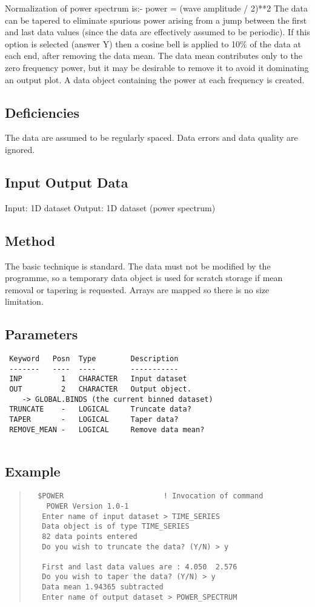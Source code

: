 \documentclass{book}
\renewcommand{\_}{{\tt\char'137}}     %
\begin{document}
Normalization of power spectrum is:-
power = (wave amplitude / 2)**2
The data can be tapered to eliminate spurious power arising from
a jump between the first and last data values (since the data
are effectively assumed to be periodic). If this option is
selected (answer Y) then a cosine bell is applied to 10\% of the
data at each end, after removing the data mean.
The data mean contributes only to the zero frequency power, but
it may be desirable to remove it to avoid it dominating an output
plot.
A data object containing the power at each frequency is created.
\subsection{Deficiencies}
The data are assumed to be regularly spaced. Data errors and data
quality are ignored.
\subsection{Input Output Data}
Input: 1D dataset
Output: 1D dataset (power spectrum)
\subsection{Method}
The basic technique is standard. The data must not be modified by
the programme, so a temporary data object is used for scratch
storage if mean removal or tapering is requested. Arrays are
mapped so there is no size limitation.
 
\subsection{Parameters}
\begin{verbatim}
 Keyword   Posn  Type        Description
 -------   ----  ----        -----------
 INP         1   CHARACTER   Input dataset
 OUT         2   CHARACTER   Output object.
    -> GLOBAL.BINDS (the current binned dataset)
 TRUNCATE    -   LOGICAL     Truncate data?
 TAPER       -   LOGICAL     Taper data?
 REMOVE_MEAN -   LOGICAL     Remove data mean?
 
\end{verbatim}\subsection{Example}
\begin{quote}\begin{verbatim}
  $POWER                       ! Invocation of command
    POWER Version 1.0-1
   Enter name of input dataset > TIME_SERIES
   Data object is of type TIME_SERIES
   82 data points entered
   Do you wish to truncate the data? (Y/N) > y
 
   First and last data values are : 4.050  2.576
   Do you wish to taper the data? (Y/N) > y
   Data mean 1.94365 subtracted
   Enter name of output dataset > POWER_SPECTRUM
\end{verbatim}\end{quote}
\end{document}
